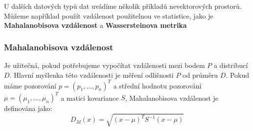 U dalších datových typů dat uvádíme několik příkladů nevektorových prostorů. Můžeme například použít vzdálenost použitelnou ve statistice, jako je \textbf{Mahalanobisova vzdálenost} a \textbf{Wassersteinova metrika}

\subsubsection{Mahalanobisova vzdálenost}
Je užitečná, pokud potřebujeme vypočítat vzdálenosti mezi bodem $ P$ a distribucí $D$. Hlavní myšlenka této vzdálenosti je měření odlišnosti $P$ od průměru $D$.
Pokud máme pozorování $p = (p_1,..., p_n)^T$ a střední hodnotu pozorování $\mu=(\mu_1,...,\mu_n)^T $ a matici kovariance $S$, Mahalanobisova vzdálenost je definována jako:
$$D_M(x) = \sqrt{(x - \mu)^T S^{-1} (x-\mu)}$$

